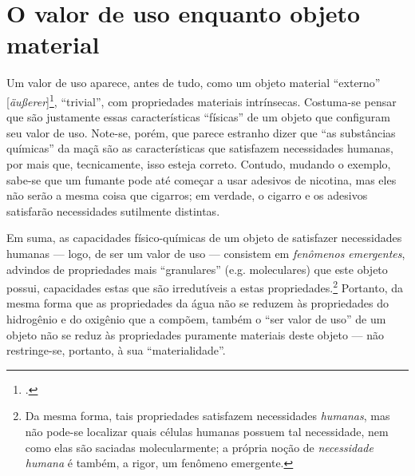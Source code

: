 \documentclass[12pt]{article}
\begin{document}

\section{O valor de uso enquanto objeto material}
Um valor de uso aparece, antes de tudo, como um objeto material ``externo'' [\textit{äußerer}]\footnote{\cite[p. 113]{Marx2017a}.}, ``trivial'', com propriedades materiais intrínsecas. Costuma-se pensar que são justamente essas características ``físicas'' de um objeto que configuram seu valor de uso. Note-se, porém, que parece estranho dizer que ``as substâncias químicas'' da maçã são as características que satisfazem necessidades humanas, por mais que, tecnicamente, isso esteja correto. Contudo, mudando o exemplo, sabe-se que um fumante pode até começar a usar adesivos de nicotina, mas eles não serão a mesma coisa que cigarros; em verdade, o cigarro e os adesivos satisfarão necessidades sutilmente distintas. 

Em suma, as capacidades físico-químicas de um objeto de satisfazer necessidades humanas --- logo, de ser um valor de uso --- consistem em \textit{fenômenos emergentes}, advindos de propriedades mais ``granulares'' (e.g. moleculares) que este objeto possui, capacidades estas que são irredutíveis a estas propriedades.\footnote{Da mesma forma, tais propriedades satisfazem necessidades \textit{humanas}, mas não pode-se localizar quais células humanas possuem tal necessidade, nem como elas são saciadas molecularmente; a própria noção de \textit{necessidade humana} é também, a rigor, um fenômeno emergente.} Portanto, da mesma forma que as propriedades da água não se reduzem às propriedades do hidrogênio e do oxigênio que a compõem, também o ``ser valor de uso'' de um objeto não se reduz às propriedades puramente materiais deste objeto --- não restringe-se, portanto, à sua ``materialidade''.
\end{document}
